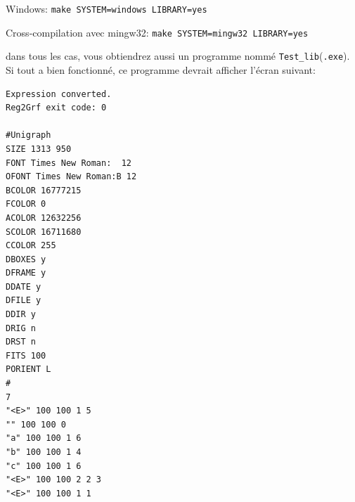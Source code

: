 \bigskip
Windows: \verb+make SYSTEM=windows LIBRARY=yes+

Cross-compilation avec mingw32: \verb+make SYSTEM=mingw32 LIBRARY=yes+

\bigskip
\noindent dans tous les cas, vous obtiendrez aussi un programme nommé
\verb+Test_lib+(\verb+.exe+). Si tout a bien fonctionné, ce programme devrait afficher l'écran
suivant:

\begin{verbatim}
Expression converted.
Reg2Grf exit code: 0

#Unigraph
SIZE 1313 950
FONT Times New Roman:  12
OFONT Times New Roman:B 12
BCOLOR 16777215
FCOLOR 0
ACOLOR 12632256
SCOLOR 16711680
CCOLOR 255
DBOXES y
DFRAME y
DDATE y
DFILE y
DDIR y
DRIG n
DRST n
FITS 100
PORIENT L
#
7
"<E>" 100 100 1 5
"" 100 100 0
"a" 100 100 1 6
"b" 100 100 1 4
"c" 100 100 1 6
"<E>" 100 100 2 2 3
"<E>" 100 100 1 1
\end{verbatim}
